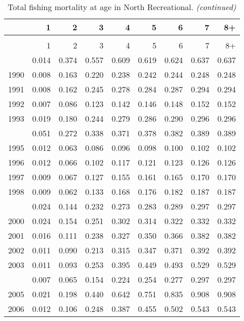\documentclass[
]{article}
\begin{document}
\begin{longtable}[t]{lrrrrrrrr}
\caption{\label{tab:North_Recreational-fleet-FAA-table}Total fishing mortality at age in North Recreational.}\\
\toprule
  & 1 & 2 & 3 & 4 & 5 & 6 & 7 & 8+\\
\midrule
\endfirsthead
\caption[]{Total fishing mortality at age in North Recreational. \textit{(continued)}}\\
\toprule
  & 1 & 2 & 3 & 4 & 5 & 6 & 7 & 8+\\
\midrule
\endhead

\endfoot
\bottomrule
\endlastfoot
1989 & 0.014 & 0.374 & 0.557 & 0.609 & 0.619 & 0.624 & 0.637 & 0.637\\
1990 & 0.008 & 0.163 & 0.220 & 0.238 & 0.242 & 0.244 & 0.248 & 0.248\\
1991 & 0.008 & 0.162 & 0.245 & 0.278 & 0.284 & 0.287 & 0.294 & 0.294\\
1992 & 0.007 & 0.086 & 0.123 & 0.142 & 0.146 & 0.148 & 0.152 & 0.152\\
1993 & 0.019 & 0.180 & 0.244 & 0.279 & 0.286 & 0.290 & 0.296 & 0.296\\
\addlinespace
1994 & 0.051 & 0.272 & 0.338 & 0.371 & 0.378 & 0.382 & 0.389 & 0.389\\
1995 & 0.012 & 0.063 & 0.086 & 0.096 & 0.098 & 0.100 & 0.102 & 0.102\\
1996 & 0.012 & 0.066 & 0.102 & 0.117 & 0.121 & 0.123 & 0.126 & 0.126\\
1997 & 0.009 & 0.067 & 0.127 & 0.155 & 0.161 & 0.165 & 0.170 & 0.170\\
1998 & 0.009 & 0.062 & 0.133 & 0.168 & 0.176 & 0.182 & 0.187 & 0.187\\
\addlinespace
1999 & 0.024 & 0.144 & 0.232 & 0.273 & 0.283 & 0.289 & 0.297 & 0.297\\
2000 & 0.024 & 0.154 & 0.251 & 0.302 & 0.314 & 0.322 & 0.332 & 0.332\\
2001 & 0.016 & 0.111 & 0.238 & 0.327 & 0.350 & 0.366 & 0.382 & 0.382\\
2002 & 0.011 & 0.090 & 0.213 & 0.315 & 0.347 & 0.371 & 0.392 & 0.392\\
2003 & 0.011 & 0.093 & 0.253 & 0.395 & 0.449 & 0.493 & 0.529 & 0.529\\
\addlinespace
2004 & 0.007 & 0.065 & 0.154 & 0.224 & 0.254 & 0.277 & 0.297 & 0.297\\
2005 & 0.021 & 0.198 & 0.440 & 0.642 & 0.751 & 0.835 & 0.908 & 0.908\\
2006 & 0.012 & 0.106 & 0.248 & 0.387 & 0.455 & 0.502 & 0.543 & 0.543\\

\end{longtable}
\end{document}
